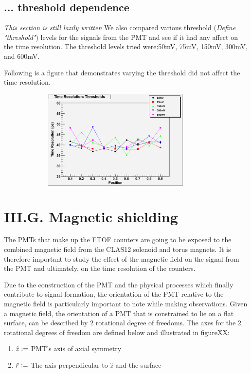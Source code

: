 \documentclass[12pt]{article}
\newcommand{\defeq}{\vcentcolon=}
\begin{document}
\subsection{... threshold dependence}
\textit{This section is still lazily written}
We also compared various threshold (\textit{Define "threshold"}) levels for the signals from the PMT and see if it had any affect on the time resolution. The threshold levels tried were:50mV, 75mV, 150mV, 300mV, and 600mV.

Following is a figure that demonstrates varying the threshold did not affect the time resolution.
\begin{figure}[th]
	\includegraphics[width=10cm, height=5cm]{ThresholdsTimeRes.pdf}
\end{figure}

\section{III.G. Magnetic shielding}
The PMTs that make up the FTOF counters are going to be exposed to the combined magnetic field from the CLAS12 solenoid and torus magnets. It is therefore important to study the effect of the magnetic field on the signal from the PMT and ultimately, on the time resolution of the counters.

Due to the construction of the PMT and the physical processes which finally contribute to signal formation, the orientation of the PMT relative to the magnetic field is particularly important to note while making observations.  Given a magnetic field, the orientation of a PMT that is constrained to lie on a flat surface, can be described by 2 rotational degree of freedoms. The axes for the 2 rotational degrees of freedom are defined below and illustrated in figureXX:

\begin{enumerate}
	\item $\hat{z} \defeq$ PMT's axis of axial symmetry 
	\item $\hat{r} \defeq$ The axis perpendicular to $\hat{z}$ and the surface
\end{enumerate}
\end{document}
